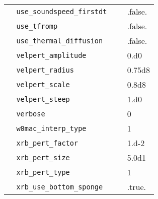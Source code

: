 {\begin{center}
\begin{longtable}{|l|p{3.25in}|l|}
\verb=  use_soundspeed_firstdt =  &   &  .false. \\
\verb=  use_tfromp =  &   &  .false. \\
\verb=  use_thermal_diffusion =  &   &  .false. \\
\verb=  velpert_amplitude =  &   &  0.d0 \\
\verb=  velpert_radius =  &   &  0.75d8 \\
\verb=  velpert_scale =  &   &  0.8d8 \\
\verb=  velpert_steep =  &   &  1.d0 \\
\verb=  verbose =  &   &  0 \\
\verb=  w0mac_interp_type =  &   &  1 \\
\verb=  xrb_pert_factor =  &   &  1.d-2 \\
\verb=  xrb_pert_size =  &   &  5.0d1 \\
\verb=  xrb_pert_type =  &   &  1 \\
\verb=  xrb_use_bottom_sponge =  &   &  .true. \\

\end{longtable}
\end{center}

} %

%

